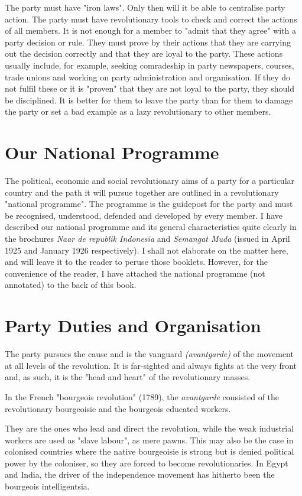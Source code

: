 The party must have "iron laws". Only then will it be able to centralise party action. The party must have revolutionary tools to check and 
correct the actions of all members. It is not enough for a member to "admit that they agree" with a party decision or rule. They must 
prove by their actions that they are carrying out the decision correctly and that they are loyal to the party. These actions usually 
include, for example, seeking comradeship in party newspapers, courses, trade unions and working on party administration and organisation. 
If they do not fulfil these or it is "proven" that they are not loyal to the party, they should be disciplined. It is better for them 
to leave the party than for them to damage the party or set a bad example as a lazy revolutionary to other members.\nline

\section{Our National Programme}

The political, economic and social revolutionary aims of a party for a particular country and the path it will pursue together are outlined 
in a revolutionary "national programme". The programme is the guidepost for the party and must be recognised, understood, defended and 
developed by every member. I have described our national programme and its general characteristics quite clearly in the brochures 
\emph{Naar de republik Indonesia} and \emph{Semangat Muda} (issued in April 1925 and January 1926 respectively). I shall not elaborate on the matter here, 
and will leave it to the reader to peruse those booklets. However, for the convenience of the reader, I have attached the national programme 
(not annotated) to the back of this book.

\section{Party Duties and Organisation}

The party pursues the cause and is the vanguard \emph{(avantgarde)} of the movement at all levels of the revolution. It is far-sighted and always 
fights at the very front and, as such, it is the "head and heart" of the revolutionary masses.\nline

In the French "bourgeois revolution" (1789), the \emph{avantgarde} consisted of the revolutionary bourgeoisie and the bourgeois educated workers.\nline

They are the ones who lead and direct the revolution, while the weak industrial workers are used as "slave labour", as mere pawns. 
This may also be the case in colonised countries where the native bourgeoisie is strong but is denied political power by the coloniser, 
so they are forced to become revolutionaries. In Egypt and India, the driver of the independence movement has hitherto been the bourgeois 
intelligentsia.\nline

